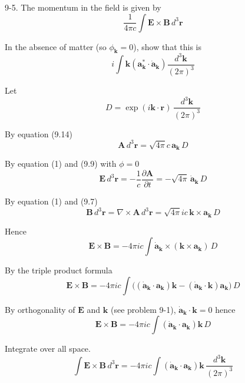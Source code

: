 \documentclass[12pt]{article}
\begin{document}
9-5.
The momentum in the field is given by
\begin{equation*}
\frac{1}{4\pi c}\int
\mathbf E\times\mathbf B\,d^3\mathbf r
\end{equation*}

In the absence of matter (so $\phi_{\mathbf k}=0$),
show that this is
\begin{equation*}
i\int\mathbf k\left(\mathbf a_{\mathbf k}^*\cdot\dot{\mathbf a}_{\mathbf k}\right)
\frac{d^3\mathbf k}{(2\pi)^3}
\end{equation*}

Let
\begin{equation*}
D=\exp(i\mathbf k\cdot\mathbf r)\,\frac{d^3\mathbf k}{(2\pi)^3}
\end{equation*}

By equation (9.14)
\begin{equation*}
\mathbf A\,d^3\mathbf r=\sqrt{4\pi}c\,\mathbf a_{\mathbf k}\,D
\tag{1}
\end{equation*}

By equation (1) and (9.9) with $\phi=0$
\begin{equation*}
\mathbf E\,d^3\mathbf r=-\frac{1}{c}\frac{\partial\mathbf A}{\partial t}
=-\sqrt{4\pi}\,\dot{\mathbf a}_{\mathbf k}\,D
\end{equation*}

By equation (1) and (9.7)
\begin{equation*}
\mathbf B\,d^3\mathbf r=\nabla\times\mathbf A\,d^3\mathbf r
=\sqrt{4\pi}ic\,\mathbf k\times\mathbf a_{\mathbf k}\,D
\end{equation*}

Hence
\begin{equation*}
\mathbf E\times\mathbf B=-4\pi ic\int
\dot{\mathbf a}_{\mathbf k}
\times\left(\mathbf k\times\mathbf a_{\mathbf k}\right)\,D
\end{equation*}

By the triple product formula
\begin{equation*}
\mathbf E\times\mathbf B=-4\pi ic\int
\big(
(\dot{\mathbf a}_{\mathbf k}\cdot\mathbf a_{\mathbf k})\mathbf k
-(\dot{\mathbf a}_{\mathbf k}\cdot\mathbf k)\mathbf a_{\mathbf k}
\big)\,D
\end{equation*}

By orthogonality of $\mathbf E$ and $\mathbf k$ (see problem 9-1),
$\dot{\mathbf a}_{\mathbf k}\cdot\mathbf k=0$ hence
\begin{equation*}
\mathbf E\times\mathbf B
=-4\pi ic\int(\dot{\mathbf a}_{\mathbf k}\cdot\mathbf a_{\mathbf k})\mathbf k
\,D
\end{equation*}

Integrate over all space.
\begin{equation*}
\int\mathbf E\times\mathbf B
\,d^3\mathbf r
=-4\pi ic\int(\dot{\mathbf a}_{\mathbf k}\cdot\mathbf a_{\mathbf k})\mathbf k
\,\frac{d^3\mathbf k}{(2\pi)^3}
\end{equation*}
\end{document}
